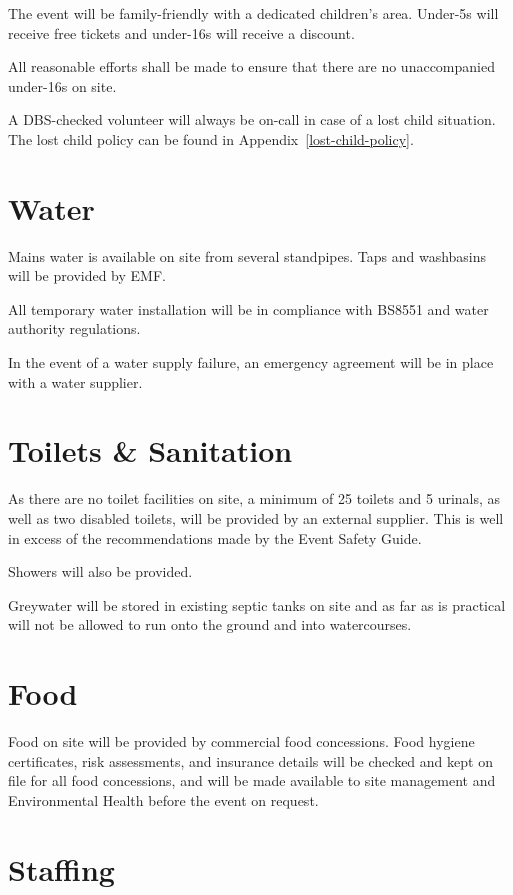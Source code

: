 The event will be family-friendly with a dedicated children's area. Under-5s will receive free tickets
and under-16s will receive a discount.

All reasonable efforts shall be made to ensure that there are no unaccompanied under-16s on site.

A DBS-checked volunteer will always be on-call in case of a lost child situation. The lost child
policy can be found in Appendix~\ref{lost-child-policy}.

\section{Water}
Mains water is available on site from several standpipes. Taps and washbasins will be provided by EMF.

All temporary water installation will be in compliance with BS8551 and water authority regulations.

In the event of a water supply failure, an emergency agreement will be in place with a water supplier.

\section{Toilets \& Sanitation}

As there are no toilet facilities on site, a minimum of 25 toilets and 5 urinals,
as well as two disabled toilets, will be provided by an external supplier. This
is well in excess of the recommendations made by the Event Safety Guide.

Showers will also be provided.

Greywater will be stored in existing septic tanks on site and as far as is practical
will not be allowed to run onto the ground and into watercourses.

\section{Food}

Food on site will be provided by commercial food concessions. Food hygiene certificates,
risk assessments, and insurance details will be checked and kept on file for all food
concessions, and will be made available to site management and Environmental Health before
the event on request.

\section{Staffing}

